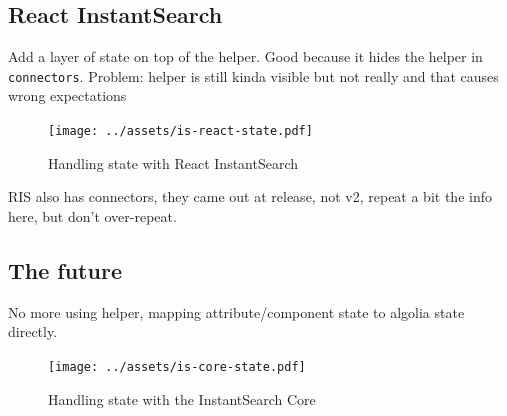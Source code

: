 

\subsection{React InstantSearch} %
\label{sub:react_instantearch}

Add a layer of state on top of the helper. Good because it hides the helper in {\tt connectors}. Problem: helper is still kinda visible but not really and that causes wrong expectations %

\begin{figure}[H]
\label{figure:is-react-state}
  \centering
  \texttt{[image: ../assets/is-react-state.pdf]}
  \caption{Handling state with React InstantSearch}
\end{figure}

RIS also has connectors, they came out at release, not v2, repeat a bit the info here, but don't over-repeat. %


\subsection{The future} %
\label{sub:the_future}

No more using helper, mapping attribute/component state to algolia state directly. %

\begin{figure}[H]
\label{figure:is-core-state}
  \centering
  \texttt{[image: ../assets/is-core-state.pdf]}
  \caption{Handling state with the InstantSearch Core}
\end{figure}


